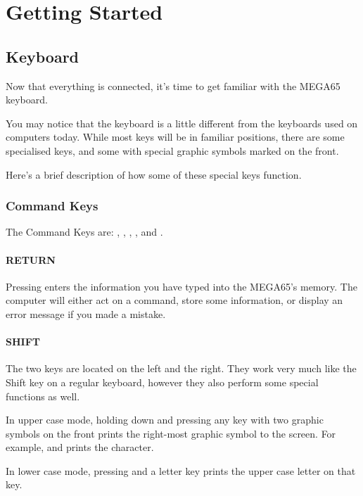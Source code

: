\chapter{Getting Started}
\section{Keyboard}
\label{cha:getting-started}

Now that everything is connected, it's time to get familiar with the MEGA65 keyboard.

You may notice that the keyboard is a little different from the keyboards used on computers today. While most keys will be in familiar positions, there are some specialised keys, and some with special graphic symbols marked on the front.

Here's a brief description of how some of these special keys function.

\subsection{Command Keys}

The Command Keys are: , , , \megasymbolkey, and .

\subsubsection{RETURN}

Pressing  enters the information you have typed into the MEGA65's memory. The computer will either act on a command, store some information, or display an error message if you made a mistake.

\subsubsection{SHIFT}

The two  keys are located on the left and the right. They work very much like the Shift key on a regular keyboard, however they also perform some special functions as well.

In upper case mode, holding down  and pressing any key with two graphic symbols on the front prints the right-most graphic symbol to the screen. For example,  and  prints the  character.

In lower case mode, pressing  and a letter key prints the upper case letter on that key.

